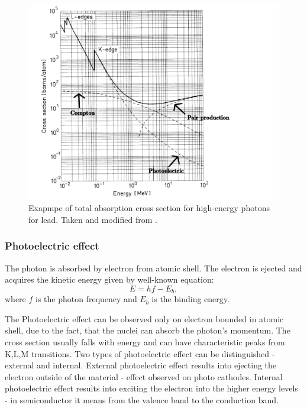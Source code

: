 \begin{figure}[H]
 \centering
 \includegraphics[scale=0.6, angle = 0]{./pictures/totalCross}
 \caption{Exapmpe of total absorption cross section for high-energy photons for lead. Taken and modified from \cite{Leo1987-wy}.}
 \label{cross}
 
\end{figure}
 


\subsubsection{Photoelectric effect}
The photon is absorbed by electron from atomic shell. The electron is ejected and acquires the kinetic energy given by well-known equation:
 \begin{equation}
 E = hf - E_{b},
 \end{equation}
where $f$ is the photon frequency and $E_{b}$ is the binding energy.
 
The Photoelectric effect can be observed only on electron bounded in atomic shell, due to the fact, that the nuclei can absorb the photon's momentum. The cross section usually falls with energy and can have characteristic peaks from K,L,M transitions. Two types of photoelectric effect can be distinguished - external and internal. External photoelectric effect results into ejecting the electron outside of the material - effect observed on photo cathodes. Internal photoelectric effect results into exciting the electron into the higher energy levels - in semiconductor it means from the valence band to the conduction band.

